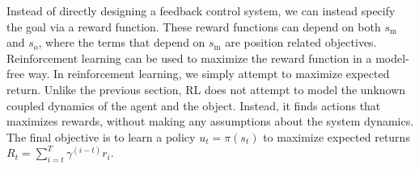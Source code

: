 Instead of directly designing a feedback control system, we can instead specify the goal via a reward function. These reward functions can depend on both $s_\text{m}$ and $s_\text{o}$, where the terms that depend on $s_\text{m}$ are position related objectives.
Reinforcement learning can be used to maximize the reward function in a model-free way. In reinforcement learning, we simply attempt to maximize expected return. Unlike the previous section, RL does not attempt to model the unknown coupled dynamics of the agent and the object. Instead, it finds actions that maximizes rewards, without making any assumptions about the system dynamics. The final objective is to learn a policy $u_t = \pi(s_t)$ to maximize expected returns $R_t = \sum_{i=t}^T \gamma^{(i - t)} r_i$.